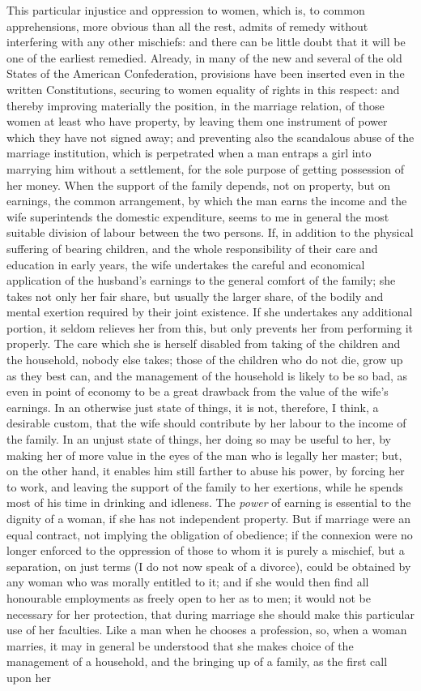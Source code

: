 \documentclass[12pt]{report}
\begin{document}
This particular injustice and oppression to women, which is, to common apprehensions, more obvious than all the rest, admits of remedy without interfering with any other mischiefs: and there can be little doubt that it will be one of the earliest remedied. Already, in many of the new and several of the old States of the American Confederation, provisions have been inserted even in the written Constitutions, securing to women equality of rights in this respect: and thereby improving materially the position, in the marriage relation, of those women at least who have property, by leaving them one instrument of power which they have not signed away; and preventing also the scandalous abuse of the marriage institution, which is perpetrated when a man entraps a girl into marrying him without a settlement, for the sole purpose of getting possession of her money. When the support of the family depends, not on property, but on earnings, the common arrangement, by which the man earns the income and the wife superintends the domestic expenditure, seems to me in general the most suitable division of labour between the two persons. If, in addition to the physical suffering of bearing children, and the whole responsibility of their care and education in early years, the wife undertakes the careful and economical application of the husband's earnings to the general comfort of the family; she takes not only her fair share, but usually the larger share, of the bodily and mental exertion required by their joint existence. If she undertakes any additional portion, it seldom relieves her from this, but only prevents her from performing it properly. The care which she is herself disabled from taking of the children and the household, nobody else takes; those of the children who do not die, grow up as they best can, and the management of the household is likely to be so bad, as even in point of economy to be a great drawback from the value of the wife's earnings. In an otherwise just state of things, it is not, therefore, I think, a desirable custom, that the wife should contribute by her labour to the income of the family. In an unjust state of things, her doing so may be useful to her, by making her of more value in the eyes of the man who is legally her master; but, on the other hand, it enables him still farther to abuse his power, by forcing her to work, and leaving the support of the family to her exertions, while he spends most of his time in drinking and idleness. The \emph{power} of earning is essential to the dignity of a woman, if she has not independent property. But if marriage were an equal contract, not implying the obligation of obedience; if the connexion were no longer enforced to the oppression of those to whom it is purely a mischief, but a separation, on just terms (I do not now speak of a divorce), could be obtained by any woman who was morally entitled to it; and if she would then find all honourable employments as freely open to her as to men; it would not be necessary for her protection, that during marriage she should make this particular use of her faculties. Like a man when he chooses a profession, so, when a woman marries, it may in general be understood that she makes choice of the management of a household, and the bringing up of a family, as the first call upon her 
\end{document}
